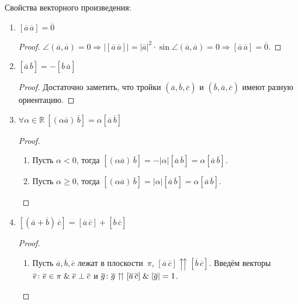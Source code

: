 Свойства векторного произведения:
\begin{enumerate}
	\item $[\overline a\,\overline a] = \overline 0$
	\begin{proof}
	$\angle(\overline a, \overline a) = 0 \Rightarrow
	|[\overline a\,\overline a]| = |\overline a|^2 \cdot \sin \angle(\overline a, \overline a) = 0 \Rightarrow
	[\overline a\,\overline a] = \overline 0$.
	\end{proof}
	
	\item $[\overline a\,\overline b] = -[\overline b\,\overline a]$
	\begin{proof}
	Достаточно заметить, что тройки $(\overline a, \overline b, \overline c)$ и $(\overline b, \overline a, \overline c)$ имеют разную ориентацию.
	\end{proof}
	
	\item $\forall \alpha \in \mathbb R \ [(\alpha \overline a)\,\overline b] = \alpha [\overline a\,\overline b]$
	\begin{proof}
	\begin{enumerate}
		\item Пусть $\alpha < 0$, тогда $[(\alpha \overline a)\,\overline b] = -|\alpha| [\overline a\,\overline b] = \alpha [\overline a\,\overline b]$.
		\item Пусть $\alpha \geqslant 0$, тогда $[(\alpha \overline a)\,\overline b] = |\alpha| [\overline a\,\overline b] = \alpha [\overline a\,\overline b]$.
	\end{enumerate}
	\end{proof}
	
	\item $[(\overline a + \overline b)\,\overline c] = [\overline a\,\overline c] + [\overline b\,\overline c]$
	\begin{proof}
	\begin{enumerate}
		\item \begin{minipage}[t]{130mm}\noindent
		Пусть $\overline a, \overline b, \overline c$ лежат в плоскости~$\pi$, $[\overline a\,\overline c] \upuparrows [\overline b\,\overline c]$.
		Введём векторы $\overline e \colon \overline e \in \pi \mathrel{\&} \overline e \perp \overline c$ и $\overline g \colon \overline g \upuparrows [\overline a\,\overline c] \opbr\lAnd |\overline g| = 1$.
		

\end{minipage}
\end{enumerate}
\end{proof}
\end{enumerate}
